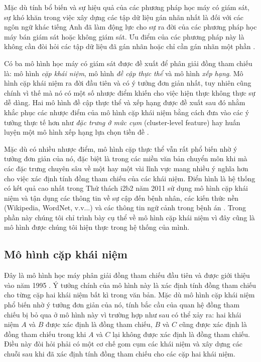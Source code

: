 Mặc dù tính bổ biến và sự hiệu quả của các phương pháp học máy có giám sát, sự khó khăn trong việc xây dựng các tập dữ liệu gán nhãn nhất là đối với các ngôn ngữ khác tiếng Anh đã làm động lực cho sự ra đời của các phương pháp học máy bán giám sát hoặc không giám sát. Ưu điểm của các phương pháp này là không cần đòi hỏi các tập dữ liệu đã gán nhãn hoặc chỉ cần gán nhãn một phần \cite{CardieWagstaff1999}.

Có ba mô hình học máy có giám sát được đề xuất để phân giải đồng tham chiếu là: mô hình \emph{cặp khái niệm}, mô hình \emph{đề cập thực thể} và mô hình \emph{xếp hạng}. Mô hình cặp khái niệm ra đời đầu tiên và có ý tưởng đơn giản nhất, tuy nhiên cũng chính vì thế mà nó có một số nhược điểm khiến cho việc hiện thực không thực sự dễ dàng. Hai mô hình đề cập thực thể và xếp hạng được đề xuất sau đó nhằm khắc phục các nhược điểm của mô hình cặp khái niệm bằng cách đưa vào các ý tưởng thực tế hơn như \emph{đặc trưng ở mức cụm} (cluster-level feature) \cite{} hay huấn luyện một mô hình xếp hạng lựa chọn tiền đề \cite{}.

Mặc dù có nhiều nhược điểm, mô hình cặp thực thể vẫn rất phổ biến nhờ ý tưởng đơn giản của nó, đặc biệt là trong các miền văn bản chuyển môn khi mà các đặc trưng chuyên sâu về một hay một vài lĩnh vực mang nhiều ý nghĩa hơn cho việc xác định tính đồng tham chiếu của các khái niệm. Điển hình là hệ thống có kết quả cao nhất trong Thử thách i2b2 năm 2011 sử dụng mô hình cặp khái niệm và tận dụng các thông tin về sự cập đến bệnh nhân, các kiến thức nền (Wikipedia, WordNet, v.v...) và các thông tin ngữ cảnh trong bệnh án \cite{YanXu2012}. Trong phần này chúng tôi chỉ trình bày cụ thể về mô hình cặp khái niệm vì đây cũng là mô hình được chúng tôi hiện thực trong hệ thống của mình.

\subsection*{Mô hình cặp khái niệm}
Đây là mô hình học máy phân giải đồng tham chiếu đầu tiên và được giới thiệu vào năm 1995 \cite{}. Ý tưởng chính của mô hình này là xác định tính đồng tham chiếu cho từng cặp hai khái niệm bất kì trong văn bản. Mặc dù mô hình cặp khái niệm phổ biến nhờ ý tưởng đơn giản của nó, tính bắc cầu của quan hệ đồng tham chiếu bị bỏ qua ở mô hình này vì trường hợp như sau có thể xảy ra: hai khái niệm $A$ và $B$ được xác định là đồng tham chiếu, $B$ và $C$ cũng được xác định là đồng tham chiếu trong khi $A$ và $C$ lại không được xác định là đồng tham chiếu. Điều này đòi hỏi phải có một cơ chế gom cụm các khái niệm và xây dựng các chuỗi sau khi đã xác định tính đồng tham chiếu cho các cặp hai khái niệm.

